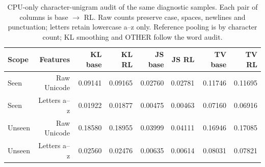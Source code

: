 \begin{table}[htbp]
\centering\scriptsize
\caption{CPU-only character-unigram audit of the same diagnostic samples. Each pair of columns is base $\to$ RL. Raw counts preserve case, spaces, newlines and punctuation; letters retain lowercase a--z only. Reference pooling is by character count; KL smoothing and OTHER follow the word audit.}\label{tab:character-audit-new}
\begin{tabular}{@{}lrrrrrrr@{}}
\toprule
Scope & Features & KL base & KL RL & JS base & JS RL & TV base & TV RL\\
\midrule
Seen & Raw Unicode & 0.09141 & 0.09165 & 0.02760 & 0.02781 & 0.11746 & 0.11695\\
Seen & Letters a--z & 0.01922 & 0.01877 & 0.00475 & 0.00463 & 0.07160 & 0.06916\\
Unseen & Raw Unicode & 0.18580 & 0.18955 & 0.03999 & 0.04111 & 0.16946 & 0.17085\\
Unseen & Letters a--z & 0.02560 & 0.02476 & 0.00635 & 0.00614 & 0.08031 & 0.07821\\
\bottomrule
\end{tabular}
\end{table}
